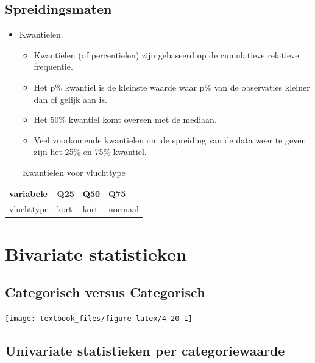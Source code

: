 \documentclass[]{tufte-book}
\providecommand{\tightlist}{%
  \setlength{\itemsep}{0pt}\setlength{\parskip}{0pt}}
\begin{document}
\hypertarget{spreidingsmaten-1}{%
\subsection*{Spreidingsmaten}\label{spreidingsmaten-1}}

\begin{itemize}
\tightlist
\item
  Kwantielen.

  \begin{itemize}
  \tightlist
  \item
    Kwantielen (of percentielen) zijn gebaseerd op de cumulatieve relatieve frequentie.
  \item
    Het p\% kwantiel is de kleinste waarde waar p\% van de observaties kleiner dan of gelijk aan is.
  \item
    Het 50\% kwantiel komt overeen met de mediaan.
  \item
    Veel voorkomende kwantielen om de spreiding van de data weer te geven zijn het 25\% en 75\% kwantiel.
  \end{itemize}
\end{itemize}

\begin{table}

\caption{\label{tab:4-7}Kwantielen voor vluchttype}
\centering
\fontsize{10}{12}\selectfont
\begin{tabular}[t]{llll}
\toprule
variabele & Q25 & Q50 & Q75\\
\midrule
vluchttype & kort & kort & normaal\\
\bottomrule
\end{tabular}
\end{table}

\hypertarget{bivariate-statistieken}{%
\section{Bivariate statistieken}\label{bivariate-statistieken}}

\hypertarget{categorisch-versus-categorisch}{%
\subsection{Categorisch versus Categorisch}\label{categorisch-versus-categorisch}}

\texttt{[image: textbook\_files/figure-latex/4-20-1]}

\hypertarget{univariate-statistieken-per-categoriewaarde}{%
\subsection*{Univariate statistieken per categoriewaarde}\label{univariate-statistieken-per-categoriewaarde}}
\end{document}
